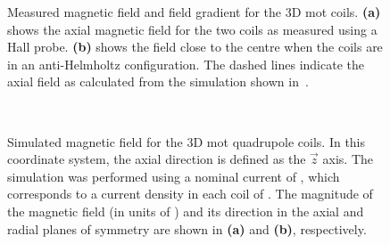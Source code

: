 \begin{figure}[!htbp]
	\centering
	\def\svgwidth{\columnwidth}
  \label{fig:coil_a}
  \label{fig:coil_b}
	\caption[Measured magnetic field and field gradient for the 3D \ac{mot}
		coils]{Measured magnetic field and field gradient for the 3D \ac{mot}
		coils. \textbf{(a)} shows the axial magnetic field for the two coils as
		measured using a Hall probe. \textbf{(b)} shows the field close to the centre when the coils are in an anti-Helmholtz configuration. The dashed lines indicate the axial field as
		calculated from the simulation shown
		in~.}
    \label{fig:mot_coil_plots_subfig}	
\end{figure}

\begin{figure}[!htbp]
	\centering
	\def\svgwidth{\columnwidth}
	\\
	\caption[Simulated magnetic field for the 3D \ac{mot} quadrupole
		coils]{Simulated magnetic field for the 3D \ac{mot} quadrupole coils. In
		this coordinate system, the axial direction is defined as the
		\(\vec{z}\) axis. The simulation was performed using a nominal current
		of , which corresponds to a current density in
		each coil of . The
		magnitude of the magnetic field (in units of \sivalue{}{\gauss}) and its
		direction in the axial and radial planes of symmetry are shown in
		\textbf{(a)} and
		\textbf{(b)}, respectively.}
	\label{fig:3D_mot_field_sim}
\end{figure}
